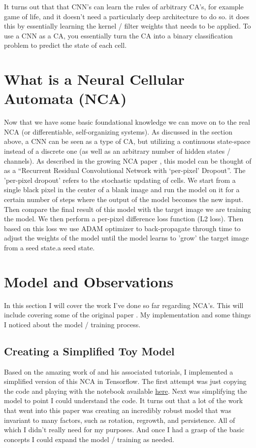 \documentclass{article}
\begin{document}
	It turns out that that CNN's can learn the rules of arbitrary CA's, for example game of life, and it doesn't need a particularly deep architecture to do so. it does this by essentially learning the kernel / filter weights that needs to be applied. To use a CNN as a CA, you essentially turn the CA into a binary classification problem to predict the state of each cell.

\section{What is a Neural Cellular Automata (NCA)}
Now that we have some basic foundational knowledge we can move on to the real NCA (or differentiable, self-organizing systems). As discussed in the section above, a CNN can be seen as a type of CA, but utilizing a continuous state-space instead of a discrete one (as well as an arbitrary number of hidden states / channels). As described in the growing NCA paper \cite{mordvintsev2020growing}, this model can be thought of as a “Recurrent Residual Convolutional Network with ‘per-pixel’ Dropout”. The 'per-pixel dropout' refers to the stochastic updating of cells. We start from a single black pixel in the center of a blank image and run the model on it for a certain number of steps where the output of the model becomes the new input. Then compare the final result of this model with the target image we are training the model. We then perform a per-pixel difference loss function (L2 loss). Then based on this loss we use ADAM optimizer to back-propagate through time to adjust the weights of the model until the model learns to 'grow' the target image from a seed state.a seed state.

\section{Model and Observations}
	In this section I will cover the work I've done so far regarding NCA's. This will include covering some of the original paper \cite[Growing Neural Cellular Automata]{mordvintsev2020growing}. My implementation and some things I noticed about the model / training process.

\subsection*{Creating a Simplified Toy Model}
	Based on the amazing work of \cite[A. Mordvintesev et al.]{mordvintsev2020growing} and his associated tutorials, I implemented a simplified version of this NCA in Tensorflow. The first attempt was just copying the code and playing with the notebook available \href{https://colab.research.google.com/github/google-research/self-organising-systems/blob/master/notebooks/growing_ca.ipynb}{here}. Next was simplifying the model to point I could understand the code. It turns out that a lot of the work that went into this paper was creating an incredibly robust model that was invariant to many factors, such as rotation, regrowth, and persistence. All of which I didn't really need for my purposes. And once I had a grasp of the basic concepts I could expand the model / training as needed.
	
\end{document}
